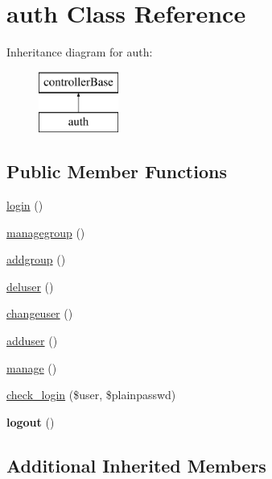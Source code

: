 \hypertarget{classauth}{\section{auth Class Reference}
\label{classauth}
}
Inheritance diagram for auth\-:\begin{figure}[H]
\begin{center}
\leavevmode
\includegraphics[height=2.000000cm]{classauth}
\end{center}
\end{figure}
\subsection*{Public Member Functions}
\begin{DoxyCompactItemize}
\item 
\hyperlink{classauth_a689697937763dd16e7e859ae430a38d3}{login} ()
\item 
\hyperlink{classauth_ae383d989a03975d0bc61c09a38e0118d}{managegroup} ()
\item 
\hyperlink{classauth_ab982268ed2adefb8cf986947b9751dab}{addgroup} ()
\item 
\hyperlink{classauth_a065eb7c74c5e51991f0d7581029aa14b}{deluser} ()
\item 
\hyperlink{classauth_a94e4cb4b38ca879867f4cd5fdb74a69c}{changeuser} ()
\item 
\hyperlink{classauth_a4d44da80906dcf985cd50ce4b154e86e}{adduser} ()
\item 
\hyperlink{classauth_ab0dc3734583e1b7fe4a7b2f76e3b117a}{manage} ()
\item 
\hyperlink{classauth_a1eae8dfe52748742162182fe1b19255e}{check\-\_\-login} (\$user, \$plainpasswd)
\item 
\hypertarget{classauth_acf39697e476e9213d8c5ed9e98f45108}{{\bfseries logout} ()}\label{classauth_acf39697e476e9213d8c5ed9e98f45108}

\end{DoxyCompactItemize}
\subsection*{Additional Inherited Members}


